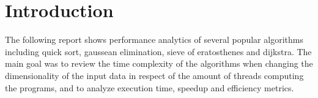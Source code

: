 \chapter{Introduction}

The following report shows performance analytics of several popular algorithms 
including quick sort, gaussean elimination, sieve of eratosthenes and dijkstra.
The main goal was to review the time complexity of the algorithms when changing 
the dimensionality of the input data in respect of the amount of threads computing 
the programs, and to analyze execution time, speedup and efficiency metrics.